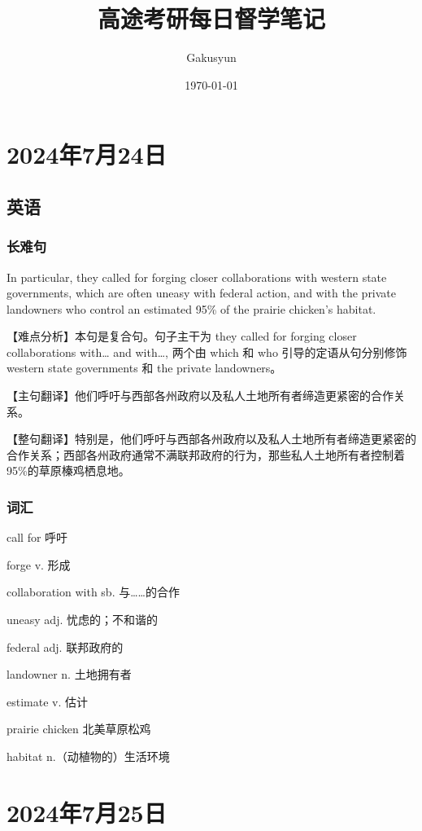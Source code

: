 \documentclass[UTF8]{ctexart}
\title{高途考研每日督学笔记}
\author{Gakusyun}
\date{\today}
\begin{document}
\maketitle
\thispagestyle{empty}
\newpage
\tableofcontents
\thispagestyle{empty}
\newpage
\setcounter{page}{1}
\section{2024年7月24日}
\subsection{英语}
\subsubsection{长难句}
In particular, they called for forging closer collaborations with western state
governments, which are often uneasy with federal action, and with the private
landowners who control an estimated 95\% of the prairie chicken's habitat.

【难点分析】本句是复合句。句子主干为 they called for forging closer
collaborations with… and with…, 两个由 which 和 who 引导的定语从句分别修饰western state governments 和 the private landowners。

【主句翻译】他们呼吁与西部各州政府以及私人土地所有者缔造更紧密的合作关系。

【整句翻译】特别是，他们呼吁与西部各州政府以及私人土地所有者缔造更紧密的合作关系；西部各州政府通常不满联邦政府的行为，那些私人土地所有者控制着 95\%的草原榛鸡栖息地。
\subsubsection{词汇}
\begin{multicols}{2}
      call for 呼吁

      forge v. 形成

      collaboration with sb. 与……的合作

      uneasy adj. 忧虑的；不和谐的

      federal adj. 联邦政府的

      landowner n. 土地拥有者

      estimate v. 估计

      prairie chicken 北美草原松鸡

      habitat n.（动植物的）生活环境
\end{multicols}
\section{2024年7月25日}
\end{document}
